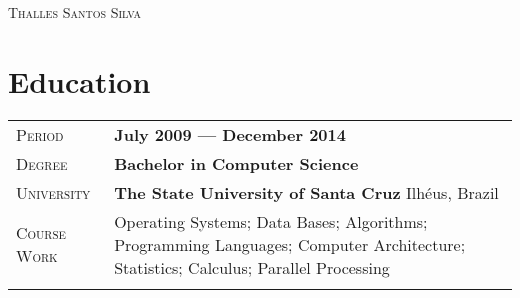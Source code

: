 \documentclass[a4paper, oneside, final]{scrartcl} %
\newcommand{\gray}{\rowcolor[gray]{.90}} %
\begin{document}
\begin{center} %


{\fontsize{36}{36}\selectfont\scshape Thalles Santos Silva} %

\vspace{1.5cm} %


%


\section{Education}

\begin{tabularx}{0.97\linewidth}{>{\raggedleft\scshape}p{2.34cm}X}
    \gray Period & \textbf{July 2009 --- December 2014}\\
    \gray Degree & \textbf{Bachelor in Computer Science}\\
	\gray University & \textbf{The State University of Santa Cruz} \hfill Ilhéus, Brazil\\
	Course Work & Operating Systems; Data Bases; Algorithms; Programming Languages; Computer Architecture; Statistics; Calculus; Parallel Processing\\
& 
\end{tabularx}

\vspace{12pt}


\end{center}
\end{document}
